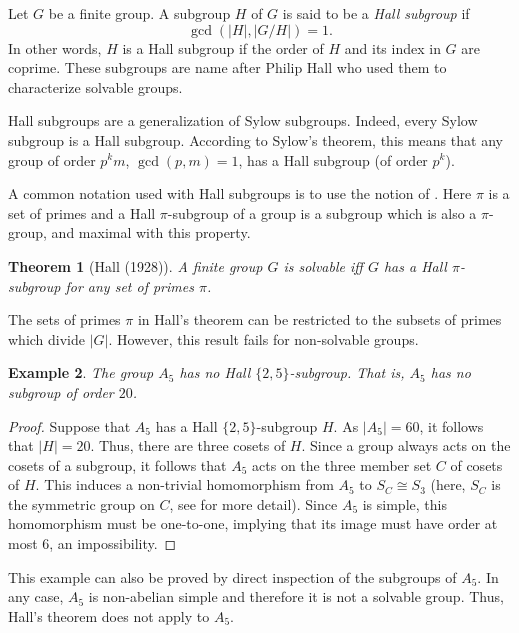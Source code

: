 \documentclass[12pt]{article}
\newtheorem{thm}{Theorem}
\newtheorem{ex}[thm]{Example}
\begin{document}
Let $G$ be a finite group.  A subgroup $H$ of $G$ is said to 
be a \emph{Hall subgroup} if $$\gcd (|H|,|G/H|)=1.$$  In other 
words, $H$ is a Hall subgroup if the order of $H$ and its index 
in $G$ are coprime.  These subgroups are 
name after Philip Hall who used them to characterize solvable groups.

Hall subgroups are a generalization of Sylow subgroups.  Indeed, 
every Sylow subgroup is a Hall subgroup.  According to Sylow's 
theorem, this means that any group of order $p^k m$, $\gcd(p,m)=1$, 
has a Hall subgroup (of order $p^k$).

A common notation used with Hall subgroups is to use the notion of
.  Here $\pi$ is a set
of primes and a Hall $\pi$-subgroup of a group is a subgroup which is
also a $\pi$-group, and maximal with this property.

\begin{thm}[Hall (1928)] 
A finite group $G$ is solvable iff $G$ has a Hall $\pi$-subgroup for
any set of primes $\pi$.
\end{thm}

The sets of primes $\pi$ in Hall's theorem can be restricted to
the subsets of primes which divide $|G|$.
However, this result fails for non-solvable groups.  

\begin{ex}
The group $A_5$ has no Hall $\{2,5\}$-subgroup.  That is,
$A_5$ has no subgroup of order $20$.
\end{ex}
\begin{proof}
Suppose that $A_5$ has a Hall $\{2,5\}$-subgroup $H$.  
As $|A_5|=60$, it follows that $|H|=20$.  Thus, there
are three cosets of $H$.  Since a group always acts
on the cosets of a subgroup, it follows that $A_5$ acts
on the three member set $C$ of cosets of $H$.  This induces
a non-trivial homomorphism from $A_5$ to $S_C\cong S_3$ 
(here, $S_C$ is the symmetric group on $C$, see 
 for more detail).
Since $A_5$ is simple, this homomorphism must be one-to-one, 
implying that its image must have order at most $6$, an 
impossibility.
\end{proof}

This example can also be proved by direct inspection of the subgroups of $A_5$.
In any case, $A_5$ is non-abelian simple and therefore it is not a
solvable group.  Thus, Hall's theorem does not apply to $A_5$.



\end{document}
